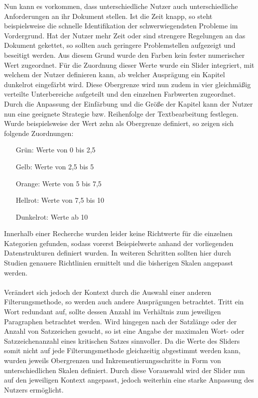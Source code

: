 Nun kann es vorkommen, dass unterschiedliche Nutzer auch unterschiedliche Anforderungen an ihr Dokument stellen. Ist die Zeit knapp, so steht beispielsweise die schnelle Identifikation der schwerwiegendsten Probleme im Vordergrund. Hat der Nutzer mehr Zeit oder sind strengere Regelungen an das Dokument gekettet, so sollten auch geringere Problemstellen aufgezeigt und beseitigt werden. Aus diesem Grund wurde den Farben kein fester numerischer Wert zugeordnet. F\"ur die Zuordnung dieser Werte wurde ein Slider integriert, mit welchem der Nutzer definieren kann, ab welcher Auspr\"agung ein Kapitel dunkelrot eingef\"arbt wird. Diese Obergrenze wird nun zudem in vier gleichm\"a{\ss}ig verteilte Unterbereiche aufgeteilt und den einzelnen Farbwerten zugeordnet. Durch die Anpassung der Einf\"arbung und die Gr\"o{\ss}e der Kapitel kann der Nutzer nun eine geeignete Strategie bzw. Reihenfolge der Textbearbeitung festlegen. Wurde beispielsweise der Wert zehn als Obergrenze definiert, so zeigen sich folgende Zuordnungen:\\
\begin{center} 
   \begin{varwidth}{2in} 
      \begin{itemize} 
         \item[Gr\"un:] Werte von 0 bis 2,5 
		 \item[Gelb:] Werte von 2,5 bis 5
		 \item[Orange:] Werte von 5 bis 7,5
		 \item[Hellrot:] Werte von 7,5 bis 10
		 \item[Dunkelrot:] Werte ab 10
      \end{itemize} 
   \end{varwidth} 
\end{center} 
Innerhalb einer Recherche wurden leider keine Richtwerte f\"ur die einzelnen Kategorien gefunden, sodass vorerst Beispielwerte anhand der vorliegenden Datenstrukturen definiert wurden. In weiteren Schritten sollten hier durch Studien genauere Richtlinien ermittelt und die bisherigen Skalen angepasst werden.\\
\\
Ver\"andert sich jedoch der Kontext durch die Auswahl einer anderen Filterungsmethode, so werden auch andere Auspr\"agungen betrachtet. Tritt ein Wort redundant auf, sollte dessen Anzahl im Verh\"altnis zum jeweiligen Paragraphen betrachtet werden. Wird hingegen nach der Satzl\"ange oder der Anzahl von Satzzeichen gesucht, so ist eine Angabe der maximalen Wort- oder Satzzeichenanzahl eines kritischen Satzes sinnvoller. Da die Werte des Sliders somit nicht auf jede Filterungsmethode gleichzeitig abgestimmt werden kann, wurden jeweils Obergrenzen und Inkrementierungsschritte in Form von unterschiedlichen Skalen definiert. Durch diese Vorauswahl wird der Slider nun auf den jeweiligen Kontext angepasst, jedoch weiterhin eine starke Anpassung des Nutzers erm\"oglicht.\\

